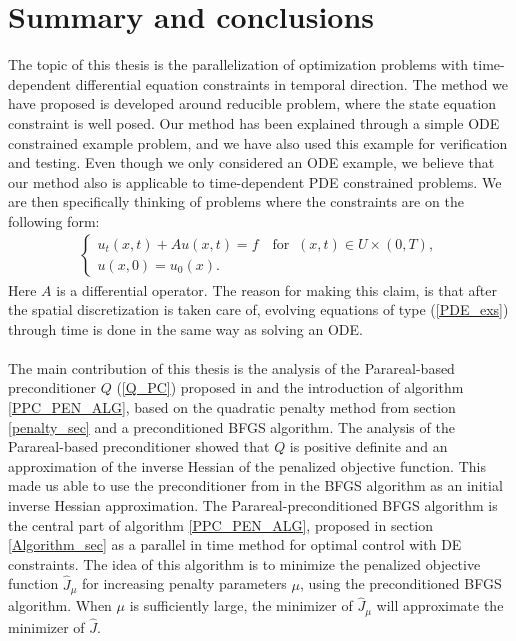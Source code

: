 \chapter{Summary and conclusions} \label{summary chap}
The topic of this thesis is the parallelization of optimization problems with time-dependent differential equation constraints in temporal direction. The method we have proposed is developed around reducible problem, where the state equation constraint is well posed. Our method has been explained through a simple ODE constrained example problem, and we have also used this example for verification and testing. Even though we only considered an ODE example, we believe that our method also is applicable to time-dependent PDE constrained problems. We are then specifically thinking of problems where the constraints are on the following form:
\begin{align}
\left\{
     \begin{array}{lr}
       	u_t(x,t) + Au(x,t)=f \quad \textrm{for } \ (x,t)\in U\times(0,T),\\
       	u(x,0)=u_0(x).
     \end{array}
   \right. \label{PDE_exs}
\end{align}
Here $A$ is a differential operator. The reason for making this claim, is that after the spatial discretization is taken care of, evolving equations of type (\ref{PDE_exs}) through time is done in the same way as solving an ODE. 
\\
\\
The main contribution of this thesis is the analysis of the Parareal-based preconditioner $Q$ (\ref{Q_PC}) proposed in \cite{maday2002parareal} and the introduction of algorithm \ref{PPC_PEN_ALG}, based on the quadratic penalty method from section \ref{penalty_sec} and a preconditioned BFGS algorithm. The analysis of the Parareal-based preconditioner showed that $Q$ is positive definite and an approximation of the inverse Hessian of the penalized objective function. This made us able to use the preconditioner from \cite{maday2002parareal} in the BFGS algorithm as an initial inverse Hessian approximation. The Parareal-preconditioned BFGS algorithm is the central part of algorithm \ref{PPC_PEN_ALG}, proposed in section \ref{Algorithm_sec} as a parallel in time method for optimal control with DE constraints. The idea of this algorithm is to minimize the penalized objective function $\hat J_{\mu}$ for increasing penalty parameters $\mu$, using the preconditioned BFGS algorithm. When $\mu$ is sufficiently large, the minimizer of $\hat J_{\mu}$ will approximate the minimizer of $\hat J$.
